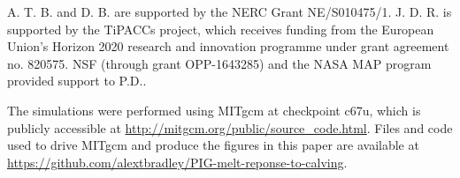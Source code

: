 \documentclass[draft]{agujournal2019}
\begin{document}
%
%

%

%




%
%
%
%
%
%
%
%


\acknowledgments
A. T. B. and D. B. are supported by the NERC Grant NE/S010475/1. J. D. R. is supported by the TiPACCs project, which receives funding from the European Union's Horizon 2020 research and innovation programme under grant agreement no. 820575. NSF (through grant OPP-1643285) and the NASA MAP program provided support to P.D..

The simulations were performed using MITgcm at checkpoint c67u, which is publicly accessible at \url{http://mitgcm.org/public/source_code.html}. Files and code used to drive MITgcm and produce the figures in this paper are available at \url{https://github.com/alextbradley/PIG-melt-reponse-to-calving}.
\end{document}
